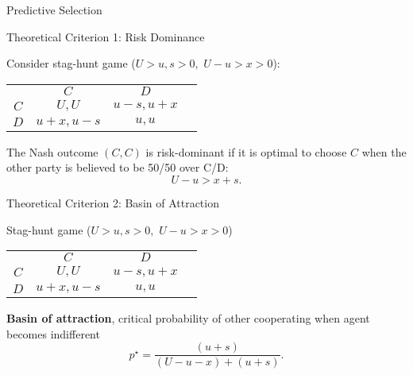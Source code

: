 \documentclass[english]{beamer}
\begin{document}
\begin{frame}{Predictive Selection}
    \centering {}
\end{frame}

\begin{frame}{Theoretical Criterion 1: Risk Dominance}
    \begin{card}
Consider stag-hunt game ($U>u,s>0,$ $U-u>x>0$):
    \begin{center}%
        \begin{tabular}{c|c|c|c}
        \multicolumn{1}{c}{} & \multicolumn{1}{c}{$C$} & \multicolumn{1}{c}{$D$} & \\ 
        \cline{2-3} \cline{3-3} 
        $C$ & $U,U$ & $u-s,u+x$ & \\ 
        \cline{2-3} \cline{3-3} 
        $D$ & $u+x,u-s$ & $u,u$ & \\ 
        \cline{2-3} \cline{3-3} 
        \end{tabular}
    \end{center}
\end{card}
\begin{card}
 The Nash outcome $(C,C)$ is risk-dominant if it is optimal to choose $C$
        when the other party is believed to be 50/50 over C/D:
        \[
        U-u>x+s.
        \]
    \end{card}
\end{frame}

\begin{frame}{Theoretical Criterion 2: Basin of Attraction}
\begin{card}
Stag-hunt game ($U>u,s>0,$ $U-u>x>0$)
    \begin{center}%
        \begin{tabular}{c|c|c|c}
            \multicolumn{1}{c}{} & \multicolumn{1}{c}{$C$} & \multicolumn{1}{c}{$D$} & \\ 
            \cline{2-3} \cline{3-3} 
            $C$ & $U,U$ & $u-s,u+x$ & \\ 
            \cline{2-3} \cline{3-3} 
            $D$ & $u+x,u-s$ & $u,u$ & \\ 
            \cline{2-3} \cline{3-3} 
        \end{tabular}
    \end{center}
\end{card}
\begin{card}
 \textbf{Basin of attraction}, critical probability of other cooperating when agent becomes indifferent
         \[
         p^{\star}=\frac{(u+s)}{(U-u-x)+(u+s)}.
        \]
\end{card}
\end{frame}
\end{document}

